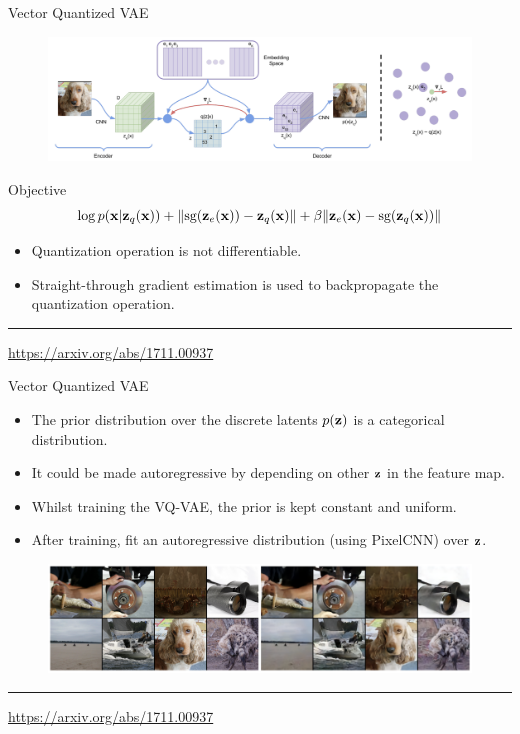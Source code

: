 \begin{frame}{Vector Quantized VAE}
	\begin{figure}
		\centering
		\includegraphics[width=\linewidth]{figs/vqvae}
	\end{figure}
	\begin{block}{Objective}
		\vspace{-0.3cm}
		\[
			\log p(\mathbf{x} | \mathbf{z}_q(\mathbf{x})) + \| \text{sg} (\mathbf{z}_e(\mathbf{x})) - \mathbf{z}_q(\mathbf{x}) \| + \beta \| \mathbf{z}_e(\mathbf{x}) - \text{sg}(\mathbf{z}_q(\mathbf{x})) \|
		\]
	\end{block}
	\begin{itemize}
		\item Quantization operation is not differentiable.
		\item Straight-through gradient estimation is used to backpropagate the quantization operation.
	\end{itemize}
	\vfill
	\hrule\medskip
	{\scriptsize \href{https://arxiv.org/abs/1711.00937}{https://arxiv.org/abs/1711.00937}} 
\end{frame}
\begin{frame}{Vector Quantized VAE}
	\begin{itemize}
		\item The prior distribution over the discrete latents $p(\mathbf{z})$ is a categorical distribution.
		\item It could be made autoregressive by depending on other $\mathbf{z}$ in the feature map. 
		\item Whilst training the VQ-VAE, the prior is kept constant and uniform. 
		\item After training, fit an autoregressive distribution (using PixelCNN) over $\mathbf{z}$.
	\end{itemize}
	\begin{figure}
		\centering
		\includegraphics[width=\linewidth]{figs/vqvae_results}
	\end{figure}
	\vfill
	\hrule\medskip
	{\scriptsize \href{https://arxiv.org/abs/1711.00937}{https://arxiv.org/abs/1711.00937}} 
\end{frame}
